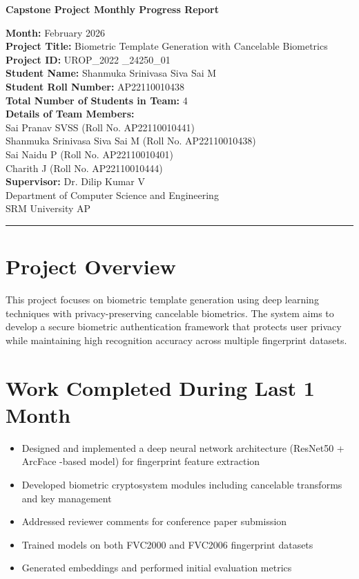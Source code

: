 \documentclass[12pt,a4paper]{article}
\begin{document}
\begin{center}
    \Large \textbf{Capstone Project Monthly Progress Report}\\[0.5cm]
    \normalsize
    
    \textbf{Month:} February 2026 \\[0.5cm]
    \textbf{Project Title:} Biometric Template Generation with Cancelable Biometrics \\[0.5cm]
    \textbf{Project ID:} UROP\_2022 \_24250\_01\\[0.5cm]
    \textbf{Student Name:} Shanmuka Srinivasa Siva Sai M \\
    \textbf{Student Roll Number:} AP22110010438\\

    \textbf{Total Number of Students in Team:} 4 \\[0.3cm]
    \textbf{Details of Team Members:}\\
    Sai Pranav SVSS  (Roll No. AP22110010441)\\
    Shanmuka Srinivasa Siva Sai M (Roll No. AP22110010438)\\
    Sai Naidu P (Roll No. AP22110010401)\\
    Charith J (Roll No. AP22110010444)\\[0.2cm]
    \textbf{Supervisor:} Dr. Dilip Kumar V \\[0.5cm]
    Department of Computer Science and Engineering\\
    SRM University AP
\end{center}

\hrule
\vspace{1cm}

\section{Project Overview}
This project focuses on biometric template generation using deep learning techniques with privacy-preserving cancelable biometrics. The system aims to develop a secure biometric authentication framework that protects user privacy while maintaining high recognition accuracy across multiple fingerprint datasets.

\section{Work Completed During Last 1 Month}
\begin{itemize}[leftmargin=*]
    \item Designed and implemented a deep neural network architecture (ResNet50 + ArcFace -based model) for fingerprint feature extraction
    \item Developed biometric cryptosystem modules including cancelable transforms and key management
    \item Addressed reviewer comments for conference paper submission
    \item Trained models on both FVC2000 and FVC2006 fingerprint datasets
    \item Generated embeddings and performed initial evaluation metrics
\end{itemize}
\end{document}
